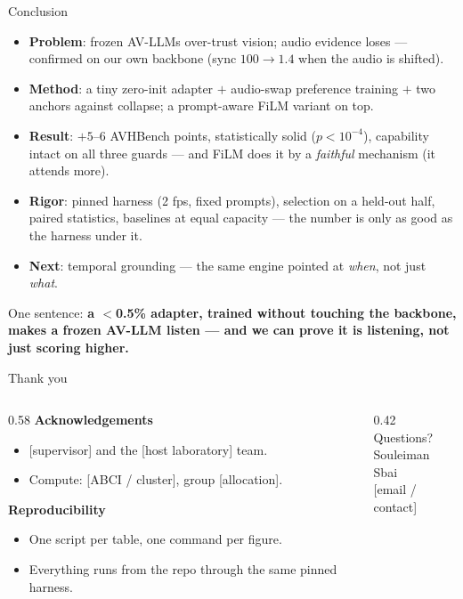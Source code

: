 \documentclass[aspectratio=169,11pt]{beamer}
\newcommand{\fillin}[1]{\textcolor{red!70!black}{[#1]}}
\begin{document}
\begin{frame}{Conclusion}
\begin{itemize}
\item \textbf{Problem}: frozen AV-LLMs over-trust vision; audio evidence loses --- confirmed on our
own backbone (sync $100\to1.4$ when the audio is shifted).
\item \textbf{Method}: a tiny zero-init adapter $+$ audio-swap preference training $+$ two anchors
against collapse; a prompt-aware FiLM variant on top.
\item \textbf{Result}: $+5$--$6$ AVHBench points, statistically solid ($p<10^{-4}$), capability
intact on all three guards --- and FiLM does it by a \emph{faithful} mechanism (it attends more).
\item \textbf{Rigor}: pinned harness (2 fps, fixed prompts), selection on a held-out half, paired
statistics, baselines at equal capacity --- the number is only as good as the harness under it.
\item \textbf{Next}: temporal grounding --- the same engine pointed at \emph{when}, not just
\emph{what}.
\end{itemize}
\vfill
\begin{center}
\begin{block}{}
\centering\small One sentence: \textbf{a $<$0.5\% adapter, trained without touching the backbone, makes
a frozen AV-LLM listen --- and we can prove it is listening, not just scoring higher.}
\end{block}
\end{center}
\end{frame}

\begin{frame}{Thank you}
\begin{columns}[T]
\begin{column}{0.58\textwidth}
\textbf{Acknowledgements}
\begin{itemize}\small
\item \fillin{supervisor} and the \fillin{host laboratory} team.
\item Compute: \fillin{ABCI / cluster}, group \fillin{allocation}.
\end{itemize}
\vspace{0.6em}
\textbf{Reproducibility}
\begin{itemize}\small
\item One script per table, one command per figure.
\item Everything runs from the repo through the same pinned harness.
\end{itemize}
\end{column}
\begin{column}{0.42\textwidth}
\centering
\vspace{0.4em}
{\Large Questions?}\\[1.2em]
{\footnotesize \color{gray} Souleiman Sbai\\ \fillin{email / contact}}
\end{column}
\end{columns}
\end{frame}
\end{document}
